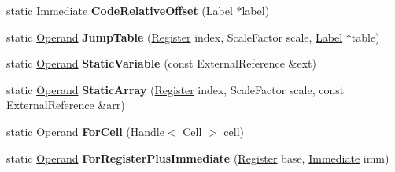 \begin{DoxyCompactItemize}
\item 
static \hyperlink{classv8_1_1internal_1_1_immediate}{Immediate} {\bfseries Code\+Relative\+Offset} (\hyperlink{classv8_1_1internal_1_1_label}{Label} $\ast$label)\hypertarget{classv8_1_1internal_1_1_b_a_s_e___e_m_b_e_d_d_e_d_a005e754d4c9b6bf1106d7a293c408f34}{}\label{classv8_1_1internal_1_1_b_a_s_e___e_m_b_e_d_d_e_d_a005e754d4c9b6bf1106d7a293c408f34}

\item 
static \hyperlink{classv8_1_1internal_1_1_operand}{Operand} {\bfseries Jump\+Table} (\hyperlink{structv8_1_1internal_1_1_register}{Register} index, Scale\+Factor scale, \hyperlink{classv8_1_1internal_1_1_label}{Label} $\ast$table)\hypertarget{classv8_1_1internal_1_1_b_a_s_e___e_m_b_e_d_d_e_d_a3b93d60e43f7114a226747883179ce93}{}\label{classv8_1_1internal_1_1_b_a_s_e___e_m_b_e_d_d_e_d_a3b93d60e43f7114a226747883179ce93}

\item 
static \hyperlink{classv8_1_1internal_1_1_operand}{Operand} {\bfseries Static\+Variable} (const External\+Reference \&ext)\hypertarget{classv8_1_1internal_1_1_b_a_s_e___e_m_b_e_d_d_e_d_a53aacd4ffa7134fcc2dcbc856eed719e}{}\label{classv8_1_1internal_1_1_b_a_s_e___e_m_b_e_d_d_e_d_a53aacd4ffa7134fcc2dcbc856eed719e}

\item 
static \hyperlink{classv8_1_1internal_1_1_operand}{Operand} {\bfseries Static\+Array} (\hyperlink{structv8_1_1internal_1_1_register}{Register} index, Scale\+Factor scale, const External\+Reference \&arr)\hypertarget{classv8_1_1internal_1_1_b_a_s_e___e_m_b_e_d_d_e_d_ab632b1c79c03685d1e3b3026591a66b6}{}\label{classv8_1_1internal_1_1_b_a_s_e___e_m_b_e_d_d_e_d_ab632b1c79c03685d1e3b3026591a66b6}

\item 
static \hyperlink{classv8_1_1internal_1_1_operand}{Operand} {\bfseries For\+Cell} (\hyperlink{classv8_1_1internal_1_1_handle}{Handle}$<$ \hyperlink{classv8_1_1internal_1_1_cell}{Cell} $>$ cell)\hypertarget{classv8_1_1internal_1_1_b_a_s_e___e_m_b_e_d_d_e_d_acc59c27da82906f4d37271d06257c7d4}{}\label{classv8_1_1internal_1_1_b_a_s_e___e_m_b_e_d_d_e_d_acc59c27da82906f4d37271d06257c7d4}

\item 
static \hyperlink{classv8_1_1internal_1_1_operand}{Operand} {\bfseries For\+Register\+Plus\+Immediate} (\hyperlink{structv8_1_1internal_1_1_register}{Register} base, \hyperlink{classv8_1_1internal_1_1_immediate}{Immediate} imm)\hypertarget{classv8_1_1internal_1_1_b_a_s_e___e_m_b_e_d_d_e_d_a81a55e9c7ef99f3c2e5e211c309b184b}{}\label{classv8_1_1internal_1_1_b_a_s_e___e_m_b_e_d_d_e_d_a81a55e9c7ef99f3c2e5e211c309b184b}

\end{DoxyCompactItemize}
